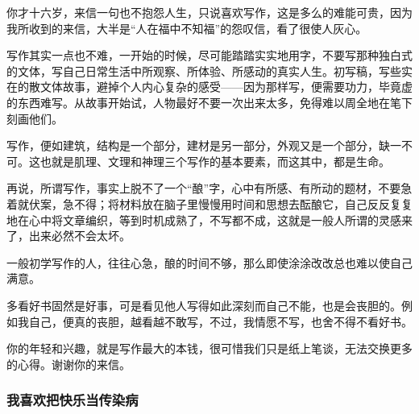 
\par {}
\par 你才十六岁，来信一句也不抱怨人生，只说喜欢写作，这是多么的难能可贵，因为我所收到的来信，大半是“人在福中不知福”的怨叹信，看了很使人灰心。
\par 写作其实一点也不难，一开始的时候，尽可能踏踏实实地用字，不要写那种独白式的文体，写自己日常生活中所观察、所体验、所感动的真实人生。初写稿，写些实在的散文体故事，避掉个人内心复杂的感受——因为那样写，便需要功力，毕竟虚的东西难写。从故事开始试，人物最好不要一次出来太多，免得难以周全地在笔下刻画他们。
\par 写作，便如建筑，结构是一个部分，建材是另一部分，外观又是一个部分，缺一不可。这也就是肌理、文理和神理三个写作的基本要素，而这其中，都是生命。
\par 再说，所谓写作，事实上脱不了一个“酿”字，心中有所感、有所动的题材，不要急着就伏案，急不得；将材料放在脑子里慢慢用时间和思想去酝酿它，自己反反复复地在心中将文章编织，等到时机成熟了，不写都不成，这就是一般人所谓的灵感来了，出来必然不会太坏。
\par 一般初学写作的人，往往心急，酿的时间不够，那么即使涂涂改改总也难以使自己满意。
\par 多看好书固然是好事，可是看见他人写得如此深刻而自己不能，也是会丧胆的。例如我自己，便真的丧胆，越看越不敢写，不过，我情愿不写，也舍不得不看好书。
\par 你的年轻和兴趣，就是写作最大的本钱，很可惜我们只是纸上笔谈，无法交换更多的心得。谢谢你的来信。
\par {}


\subsubsection{我喜欢把快乐当传染病}

